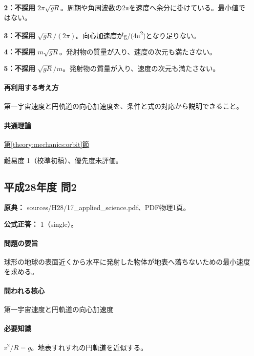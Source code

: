 \noindent\textbf{2：不採用} \(2\pi\sqrt{gR}\)。周期や角周波数の2πを速度へ余分に掛けている。最小値ではない。\par

\noindent\textbf{3：不採用} \(\sqrt{gR}/(2\pi)\)。向心加速度がg/(4π\textsuperscript{2})となり足りない。\par

\noindent\textbf{4：不採用} \(m\sqrt{gR}\)。発射物の質量が入り、速度の次元も満たさない。\par

\noindent\textbf{5：不採用} \(\sqrt{gR}/m\)。発射物の質量が入り、速度の次元も満たさない。\par

\paragraph{再利用する考え方} 第一宇宙速度と円軌道の向心加速度を、条件と式の対応から説明できること。

\paragraph{共通理論} \hyperref[theory:mechanics:orbit]{第\ref*{theory:mechanics:orbit}節}

\par 難易度 1（校準初稿）、優先度未評価。

\subsection{平成28年度 問2}
\label{q:h28-reg-applied-02}

\noindent\textbf{原典：} sources/H28/17\_applied\_science.pdf、PDF物理1頁。

\textbf{公式正答：} 1（single）。

\paragraph{問題の要旨} 球形の地球の表面近くから水平に発射した物体が地表へ落ちないための最小速度を求める。

\paragraph{問われる核心} 第一宇宙速度と円軌道の向心加速度

\paragraph{必要知識} \(v^2/R=g\)。地表すれすれの円軌道を近似する。

